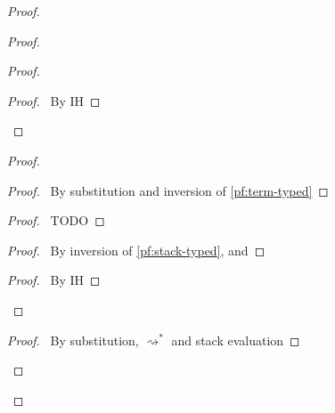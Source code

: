 \documentclass[a4paper]{article}
\begin{document}
\begin{proof}
\begin{proof}
\begin{proof}
\begin{proof}
        \pf\ By IH
      \end{proof}
    \end{proof}
    \begin{proof}
      \begin{proof}
        \pf\ By substitution and inversion of \ref{pf:term-typed}
      \end{proof}
      \begin{proof}
        \pf\ TODO
      \end{proof}
      \begin{proof}
        \pf\ By inversion of \ref{pf:stack-typed},  and 
      \end{proof}
      \qedstep
      \begin{proof}
        \pf\ By IH
      \end{proof}
    \end{proof}
    \begin{proof}
      \pf\ By substitution, $\rightsquigarrow^*$ and stack evaluation

\end{proof}
\end{proof}
\end{proof}
\end{document}
